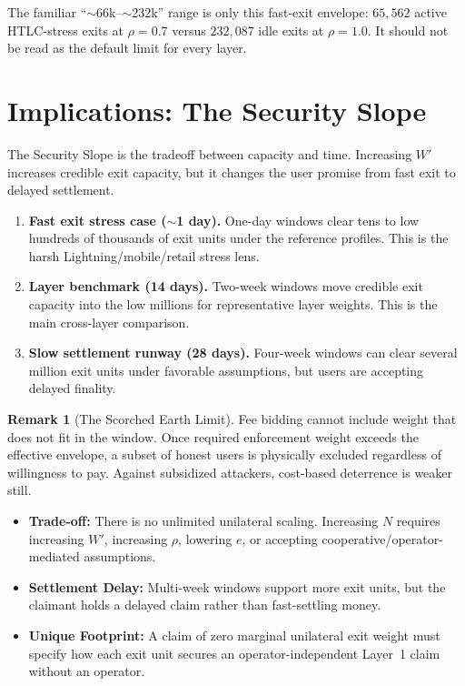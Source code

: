 \documentclass{article}
\theoremstyle{definition}
\newtheorem{remark}{Remark}
\begin{document}
The familiar ``$\sim$66k--$\sim$232k'' range is only this fast-exit envelope: $65{,}562$ active HTLC-stress exits at $\rho=0.7$ versus $232{,}087$ idle exits at $\rho=1.0$. It should not be read as the default limit for every layer.

\section{Implications: The Security Slope}
The Security Slope is the tradeoff between capacity and time. Increasing $W'$ increases credible exit capacity, but it changes the user promise from fast exit to delayed settlement.

\begin{enumerate}
    \item \textbf{Fast exit stress case ($\sim$1 day).} One-day windows clear tens to low hundreds of thousands of exit units under the reference profiles. This is the harsh Lightning/mobile/retail stress lens.
    \item \textbf{Layer benchmark (14 days).} Two-week windows move credible exit capacity into the low millions for representative layer weights. This is the main cross-layer comparison.
    \item \textbf{Slow settlement runway (28 days).} Four-week windows can clear several million exit units under favorable assumptions, but users are accepting delayed finality.
\end{enumerate}

\begin{remark}[The Scorched Earth Limit]
Fee bidding cannot include weight that does not fit in the window. Once required enforcement weight exceeds the effective envelope, a subset of honest users is physically excluded regardless of willingness to pay. Against subsidized attackers, cost-based deterrence is weaker still.
\end{remark}

\begin{itemize}
\item \textbf{Trade-off:} There is no unlimited unilateral scaling. Increasing $N$ requires increasing $W'$, increasing $\rho$, lowering $e$, or accepting cooperative/operator-mediated assumptions.
\item \textbf{Settlement Delay:} Multi-week windows support more exit units, but the claimant holds a delayed claim rather than fast-settling money.
\item \textbf{Unique Footprint:} A claim of zero marginal unilateral exit weight must specify how each exit unit secures an operator-independent Layer~1 claim without an operator.
\end{itemize}
\end{document}

